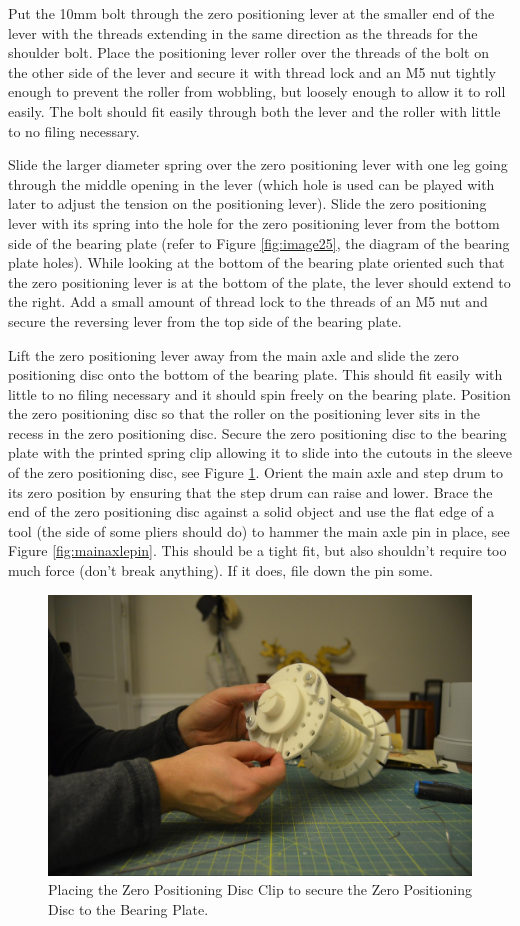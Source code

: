 \documentclass[openany]{book}
\begin{document}
Put the 10mm bolt through the zero positioning lever at the smaller end of the lever with the threads extending in the same direction as the threads for the shoulder bolt. Place the positioning lever roller over the threads of the bolt on the other side of the lever and secure it with thread lock and an M5 nut tightly enough to prevent the roller from wobbling, but loosely enough to allow it to roll easily. The bolt should fit easily through both the lever and the roller with little to no filing necessary.

Slide the larger diameter spring over the zero positioning lever with one leg going through the middle opening in the lever (which hole is used can be played with later to adjust the tension on the positioning lever). Slide the zero positioning lever with its spring into the hole for the zero positioning lever from the bottom side of the bearing plate (refer to Figure \ref{fig:image25}, the diagram of the bearing plate holes). While looking at the bottom of the bearing plate oriented such that the zero positioning lever is at the bottom of the plate, the lever should extend to the right. Add a small amount of thread lock to the threads of an M5 nut and secure the reversing lever from the top side of the bearing plate.

Lift the zero positioning lever away from the main axle and slide the zero positioning disc onto the bottom of the bearing plate. This should fit easily with little to no filing necessary and it should spin freely on the bearing plate. Position the zero positioning disc so that the roller on the positioning lever sits in the recess in the zero positioning disc. Secure the zero positioning disc to the bearing plate with the printed spring clip allowing it to slide into the cutouts in the sleeve of the zero positioning disc, see Figure \ref{fig:image29}. Orient the main axle and step drum to its zero position by ensuring that the step drum can raise and lower. Brace the end of the zero positioning disc against a solid object and use the flat edge of a tool (the side of some pliers should do) to hammer the main axle pin in place, see Figure \ref{fig:mainaxlepin}. This should be a tight fit, but also shouldn’t require too much force (don’t break anything). If it does, file down the pin some. 

\begin{figure}[!ht]
	\centering
	\includegraphics[width=.75\textwidth]{images/image29.jpg}
	\caption{Placing the Zero Positioning Disc Clip to secure the Zero Positioning Disc to the Bearing Plate.}
	\label{fig:image29}	
\end{figure}
\end{document}
